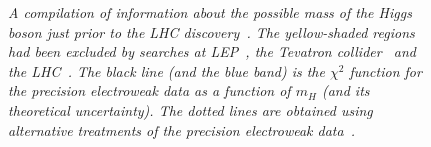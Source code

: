 \documentclass[12pt]{article}
\numberwithin{equation}{section}
\begin{document}
\begin{figure}[htb]
\begin{center}
\end{center}
\caption{\it A compilation of information about the possible mass of
  the Higgs boson just prior to the LHC discovery~\protect\cite{LEPEWWG}. The yellow-shaded regions
  had been excluded by searches at LEP~\protect\cite{LEPH}, the
  Tevatron collider~\protect\cite{TeVH} and the
  LHC~\protect\cite{ATLASH,CMSH}. The black line (and the blue band)
  is the $\chi^2$ function for the precision electroweak data as a
  function of $m_H$ (and its theoretical uncertainty). The dotted
  lines are obtained using alternative treatments of the precision
  electroweak data~\protect\cite{LEPEWWG}.  }
\label{fig:blueband}
\end{figure}
\end{document}
